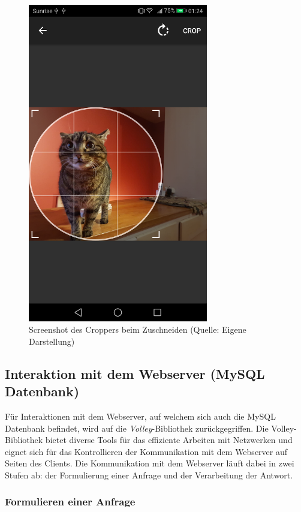 \documentclass[../main.tex]{subfiles}
\begin{document}
	\begin{figure}
		\centering
		\includegraphics[width=0.7\textwidth]{./images/cropper.png}
		\caption{Screenshot des Croppers beim Zuschneiden (Quelle: Eigene Darstellung)}
		\label{cropperImage}
	\end{figure}
	
	\subsection{Interaktion mit dem Webserver (MySQL Datenbank)}
	Für Interaktionen mit dem Webserver, auf welchem sich auch die MySQL Datenbank befindet, wird auf die \emph{Volley}-Bibliothek zurückgegriffen. Die Volley-Bibliothek bietet diverse Tools für das effiziente Arbeiten mit Netzwerken und eignet sich für das Kontrollieren der Kommunikation mit dem Webserver auf Seiten des Clients. Die Kommunikation mit dem Webserver läuft dabei  in zwei Stufen ab: der Formulierung einer Anfrage und der Verarbeitung der Antwort.
	
	\subsubsection{Formulieren einer Anfrage}
	
\end{document}

